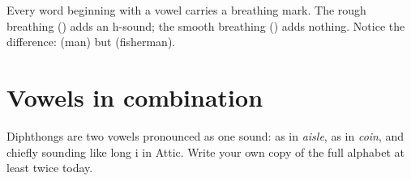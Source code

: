 Every word beginning with a vowel carries a breathing mark. The rough
breathing () adds an h-sound; the smooth breathing () adds nothing.
Notice the difference:  (man) but  (fisherman).

\section{Vowels in combination}

Diphthongs are two vowels pronounced as one sound:  as in \emph{aisle},
 as in \emph{coin}, and  chiefly sounding like long i in Attic.
Write your own copy of the full alphabet at least twice today.

